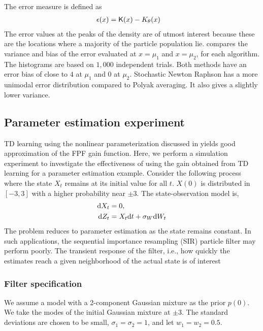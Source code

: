 The error measure is defined as
\begin{equation*}
\begin{aligned}
\epsilon(x) &= \text{\sf K}(x)-K_\theta(x)
\end{aligned}
\end{equation*}
The error values at the peaks of the density are of utmost interest because these are the locations where a majority of the particle population lie.   compares the variance and bias of the error evaluated at $x=\mu_{1}$ and $x=\mu_{2}$, for each algorithm. The histograms are based on $1,000$ independent trials. Both methods have an error bias of close to $4$ at $\mu_{1}$ and $0$ at $\mu_{2}$. Stochastic Newton Raphson has a more unimodal error distribution compared to Polyak averaging. It also gives a slightly lower variance.




\subsection{Parameter estimation experiment}


TD learning using the nonlinear parameterization discussed in  yields good approximation of the FPF gain function. Here, we perform a simulation experiment to investigate the effectiveness of using the gain obtained from TD learning for a parameter estimation example. Consider the following process where the state $X_t$ remains at its initial value for all $t$. $X(0)$ is distributed in $[-3,3]$ with a higher probability near $\pm3$. The state-observation model is,
\begin{equation*}
\begin{aligned}
\text{d} X_t&=0,\quad \\
\text{d} Z_t&= X_t \text{d} t+\sigma_{W}\text{d} W_t
\end{aligned}
\end{equation*}
The problem reduces to parameter estimation as the state remains constant. In such applications, the sequential importance resampling (SIR) particle filter may perform poorly. The transient response of the filter, i.e., how quickly the estimates reach a given neighborhood of the actual state is of interest
\subsubsection*{Filter specification}  We assume a model with a 2-component Gaussian mixture as the prior $p(0)$. We take the modes of the initial Gaussian mixture at $\pm 3$. The standard deviations are chosen to be small, $\sigma_{1}=\sigma_{2}=1$, and let $w_{1}=w_{2}=0.5$.

